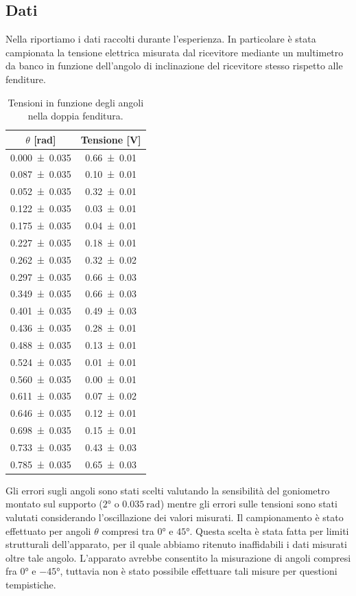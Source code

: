 \documentclass[a4paper]{article}
\begin{document}
\subsection{Dati}
Nella  riportiamo i dati raccolti durante l'esperienza. In particolare è stata campionata la tensione elettrica misurata dal ricevitore mediante un multimetro da banco in funzione dell'angolo di inclinazione del ricevitore stesso rispetto alle fenditure.
\begin{table}[H]
\centering
\caption{Tensioni in funzione degli angoli nella doppia fenditura.}
\label{tab:dati_doppia_fenditura}
\begin{tabular}{|c|c|}
\hline
$\theta$ [\si{\radian}] & Tensione [\si{\volt}] \\
\hline
\SI{0.000 \pm 0.035}{} & \SI{0.66 \pm 0.01}{} \\
\SI{0.087 \pm 0.035}{} & \SI{0.10 \pm 0.01}{} \\
\SI{0.052 \pm 0.035}{} & \SI{0.32 \pm 0.01}{} \\
\SI{0.122 \pm 0.035}{} & \SI{0.03 \pm 0.01}{} \\
\SI{0.175 \pm 0.035}{} & \SI{0.04 \pm 0.01}{} \\
\SI{0.227 \pm 0.035}{} & \SI{0.18 \pm 0.01}{} \\
\SI{0.262 \pm 0.035}{} & \SI{0.32 \pm 0.02}{} \\
\SI{0.297 \pm 0.035}{} & \SI{0.66 \pm 0.03}{} \\
\SI{0.349 \pm 0.035}{} & \SI{0.66 \pm 0.03}{} \\
\SI{0.401 \pm 0.035}{} & \SI{0.49 \pm 0.03}{} \\
\SI{0.436 \pm 0.035}{} & \SI{0.28 \pm 0.01}{} \\
\SI{0.488 \pm 0.035}{} & \SI{0.13 \pm 0.01}{} \\
\SI{0.524 \pm 0.035}{} & \SI{0.01 \pm 0.01}{} \\
\SI{0.560 \pm 0.035}{} & \SI{0.00 \pm 0.01}{} \\
\SI{0.611 \pm 0.035}{} & \SI{0.07 \pm 0.02}{} \\
\SI{0.646 \pm 0.035}{} & \SI{0.12 \pm 0.01}{} \\
\SI{0.698 \pm 0.035}{} & \SI{0.15 \pm 0.01}{} \\
\SI{0.733 \pm 0.035}{} & \SI{0.43 \pm 0.03}{} \\
\SI{0.785 \pm 0.035}{} & \SI{0.65 \pm 0.03}{} \\
\hline
\end{tabular}
\end{table}
Gli errori sugli angoli sono stati scelti valutando la sensibilità del goniometro montato sul supporto ($\ang{2}$ o $\SI{0.035}{\radian}$) mentre gli errori sulle tensioni sono stati valutati considerando l'oscillazione dei valori misurati. Il campionamento è stato effettuato per angoli $\theta$ compresi tra $\ang{0}$ e $\ang{45}$. Questa scelta è stata fatta per limiti strutturali dell'apparato, per il quale abbiamo ritenuto inaffidabili i dati misurati oltre tale angolo. L'apparato avrebbe consentito la misurazione di angoli compresi fra $\ang{0}$ e $\ang{-45}$, tuttavia non è stato possibile effettuare tali misure per questioni tempistiche.
\end{document}
